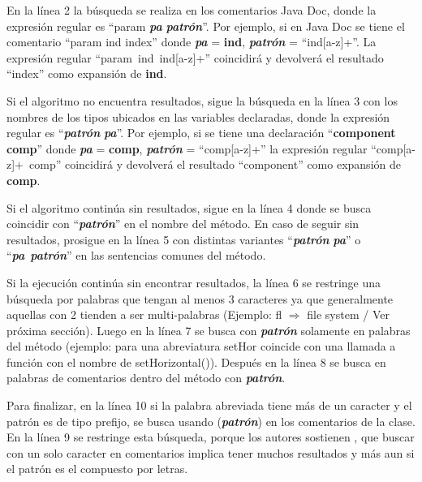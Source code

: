 En la línea 2 la búsqueda se realiza en los comentarios Java Doc, donde la expresión regular es “\at param \textit{\textbf{pa}} \textit{\textbf{patrón}}”. Por ejemplo, si en Java Doc se tiene el comentario “\at param ind index” donde \textit{\textbf{pa}} = \textbf{ind}, \textit{\textbf{patrón}} = \mbox{“ind[a-z]+”}. La expresión regular \mbox{“\at param ind ind[a-z]+”} coincidirá y devolverá el resultado  “index” como expansión de \textbf{ind}.

Si el algoritmo no encuentra resultados, sigue la búsqueda en la línea 3 con los nombres de los tipos ubicados en las variables declaradas, donde la expresión regular es “\textit{\textbf{patrón}} \textit{\textbf{pa}}”. Por ejemplo, si se tiene una declaración “\textbf{component comp}” donde \textit{\textbf{pa}} = \textbf{comp}, \textit{\textbf{patrón}} = “comp[a-z]+”  la expresión regular \mbox{“comp[a-z]+ comp”} coincidirá y devolverá el resultado  “component” como expansión de \textbf{comp}.

Si el algoritmo continúa sin resultados, sigue en la línea 4 donde se busca coincidir con “\textit{\textbf{patrón}}” en el nombre del método. En caso de seguir sin resultados, prosigue en la línea 5 con distintas variantes “\textit{\textbf{patrón}} \textit{\textbf{pa}}” o \mbox{“\textit{\textbf{pa}} \textit{\textbf{patrón}}”} en las sentencias comunes del método. 


Si la ejecución continúa sin encontrar resultados, la línea 6 se restringe una búsqueda por palabras que tengan al menos 3 caracteres ya que generalmente aquellas con 2 tienden a ser multi-palabras (Ejemplo: \textsf{fl $\Rightarrow$ file system} / Ver próxima sección). Luego en la línea 7 se busca con \textit{\textbf{patrón}} solamente en palabras del método (ejemplo: para una abreviatura \textsf{setHor} coincide con una llamada a función con el nombre de \textsf{setHorizontal()}). Después en la línea 8 se busca en palabras de comentarios dentro del método con \textit{\textbf{patrón}}.

Para finalizar, en la línea 10 si la palabra abreviada tiene más de un caracter y el patrón es de tipo prefijo, se busca usando (\textit{\textbf{patrón}}) en los comentarios de la clase. En la línea 9 se restringe esta búsqueda, porque los autores sostienen \cite{EZH08}, que buscar con un solo caracter en comentarios implica tener muchos resultados y más aun si el patrón es el compuesto por letras.

